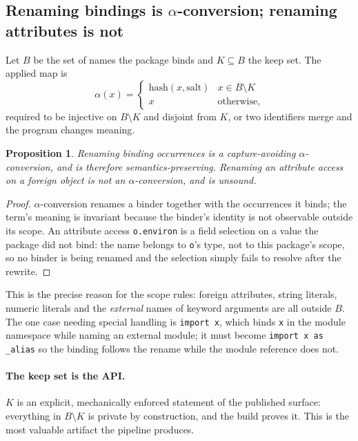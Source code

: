 \documentclass[11pt]{article}
\newtheorem{prop}{Proposition}[section]
\begin{document}
\subsection{Renaming bindings is \texorpdfstring{$\alpha$}{alpha}-conversion;
  renaming attributes is not}
\label{lbl:HS-SEC-02}

Let $B$ be the set of names the package binds and $K \subseteq B$ the keep set.
The applied map is
\begin{equation}
\alpha(x) = \begin{cases}
\mathrm{hash}(x, \mathrm{salt}) & x \in B \setminus K \\
x & \text{otherwise,}
\end{cases}
\end{equation}
required to be injective on $B \setminus K$ and disjoint from $K$, or two
identifiers merge and the program changes meaning.

\begin{prop}
Renaming binding occurrences is a capture-avoiding $\alpha$-conversion, and
is therefore semantics-preserving. Renaming an attribute access on a foreign
object is not an $\alpha$-conversion, and is unsound.
\end{prop}

\begin{proof}
$\alpha$-conversion renames a binder together with the occurrences it binds;
the term's meaning is invariant because the binder's identity is not observable
outside its scope. An attribute access \texttt{o.environ} is a field selection
on a value the package did not bind: the name belongs to \texttt{o}'s type, not
to this package's scope, so no binder is being renamed and the selection simply
fails to resolve after the rewrite.
\end{proof}

This is the precise reason for the scope rules: foreign attributes, string
literals, numeric literals and the \emph{external} names of keyword arguments
are all outside $B$. The one case needing special handling is \texttt{import x},
which binds \texttt{x} in the module namespace while naming an external module;
it must become \texttt{import x as \_alias} so the binding follows the rename
while the module reference does not.

\paragraph{The keep set is the API.} $K$ is an explicit, mechanically enforced
statement of the published surface: everything in $B \setminus K$ is private by
construction, and the build proves it. This is the most valuable artifact the
pipeline produces.
\end{document}
